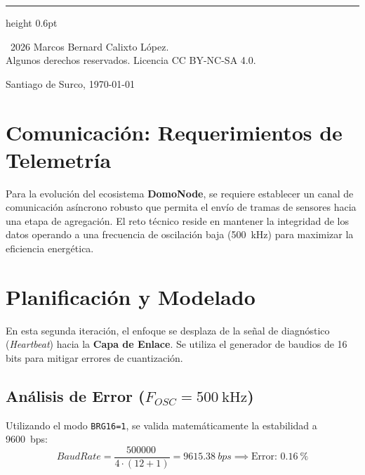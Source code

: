 \documentclass[11pt,a4paper]{article}
\begin{document}
\begin{titlepage}
    \vspace{1.5cm}
    
    \hrule height 0.6pt
    \vspace{0.2cm}
    \begin{minipage}[t]{0.65\textwidth}
        {\color{gray}\tiny \textcopyright \ 2026 Marcos Bernard Calixto López. \\ Algunos derechos reservados. Licencia CC BY-NC-SA 4.0.}
    \end{minipage}
    \begin{minipage}[t]{0.34\textwidth}
        \raggedleft
        {\color{gray}\footnotesize Santiago de Surco, \today}
    \end{minipage}
\end{titlepage}

\newpage


\section{Comunicación: Requerimientos de Telemetría}
Para la evolución del ecosistema \textbf{DomoNode}, se requiere establecer un canal de comunicación asíncrono robusto que permita el envío de tramas de sensores hacia una etapa de agregación. El reto técnico reside en mantener la integridad de los datos operando a una frecuencia de oscilación baja (\SI{500}{\kilo\hertz}) para maximizar la eficiencia energética.

\section{Planificación y Modelado}
En esta segunda iteración, el enfoque se desplaza de la señal de diagnóstico (\textit{Heartbeat}) hacia la \textbf{Capa de Enlace}. Se utiliza el generador de baudios de 16 bits para mitigar errores de cuantización.

\subsection{Análisis de Error ($F_{OSC} = \SI{500}{\kilo\hertz}$)}
Utilizando el modo \texttt{BRG16=1}, se valida matemáticamente la estabilidad a \SI{9600}{bps}:
\begin{equation}
BaudRate = \frac{\SI{500000}{}}{4 \cdot (12 + 1)} = \SI{9615.38}{bps} \implies \text{Error: } \SI{0.16}{\percent}
\end{equation}
\end{document}
